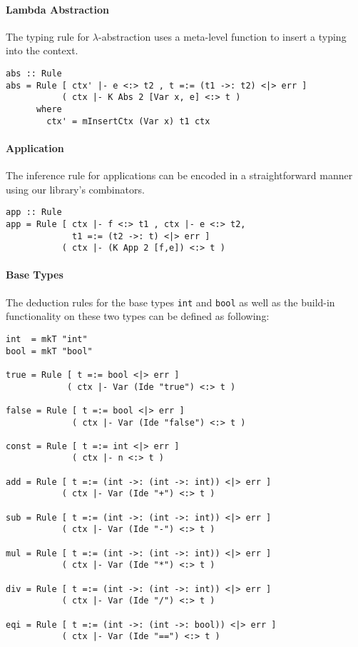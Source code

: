 \paragraph{Lambda Abstraction} The typing rule for
$\lambda$-abstraction uses a meta-level function to insert a typing
into the context.
\begin{lstlisting}
abs :: Rule
abs = Rule [ ctx' |- e <:> t2 , t =:= (t1 ->: t2) <|> err ]
           ( ctx |- K Abs 2 [Var x, e] <:> t )
      where
        ctx' = mInsertCtx (Var x) t1 ctx
\end{lstlisting}

\paragraph{Application} The inference rule for applications can be
encoded in a straightforward manner using our library's combinators.
\begin{lstlisting}
app :: Rule
app = Rule [ ctx |- f <:> t1 , ctx |- e <:> t2,
             t1 =:= (t2 ->: t) <|> err ]
           ( ctx |- (K App 2 [f,e]) <:> t )
\end{lstlisting}

\paragraph{Base Types} The deduction rules for the base types
\texttt{int} and \texttt{bool} as well as the build-in functionality
on these two types can be defined as following:

\newpage

\begin{lstlisting}
int  = mkT "int"
bool = mkT "bool"

true = Rule [ t =:= bool <|> err ]
            ( ctx |- Var (Ide "true") <:> t )

false = Rule [ t =:= bool <|> err ]
             ( ctx |- Var (Ide "false") <:> t )

const = Rule [ t =:= int <|> err ]
             ( ctx |- n <:> t )

add = Rule [ t =:= (int ->: (int ->: int)) <|> err ]
           ( ctx |- Var (Ide "+") <:> t )

sub = Rule [ t =:= (int ->: (int ->: int)) <|> err ]
           ( ctx |- Var (Ide "-") <:> t )

mul = Rule [ t =:= (int ->: (int ->: int)) <|> err ]
           ( ctx |- Var (Ide "*") <:> t )

div = Rule [ t =:= (int ->: (int ->: int)) <|> err ]
           ( ctx |- Var (Ide "/") <:> t )

eqi = Rule [ t =:= (int ->: (int ->: bool)) <|> err ]
           ( ctx |- Var (Ide "==") <:> t )
\end{lstlisting}

